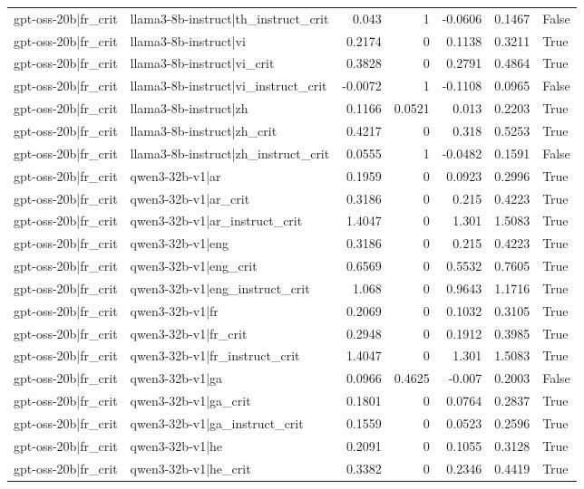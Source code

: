 \begin{table}
\begin{tabular}{l l r r r r l}
gpt-oss-20b|fr_crit & llama3-8b-instruct|th_instruct_crit & 0.043 & 1 & -0.0606 & 0.1467 & False \\
gpt-oss-20b|fr_crit & llama3-8b-instruct|vi & 0.2174 & 0 & 0.1138 & 0.3211 & True \\
gpt-oss-20b|fr_crit & llama3-8b-instruct|vi_crit & 0.3828 & 0 & 0.2791 & 0.4864 & True \\
gpt-oss-20b|fr_crit & llama3-8b-instruct|vi_instruct_crit & -0.0072 & 1 & -0.1108 & 0.0965 & False \\
gpt-oss-20b|fr_crit & llama3-8b-instruct|zh & 0.1166 & 0.0521 & 0.013 & 0.2203 & True \\
gpt-oss-20b|fr_crit & llama3-8b-instruct|zh_crit & 0.4217 & 0 & 0.318 & 0.5253 & True \\
gpt-oss-20b|fr_crit & llama3-8b-instruct|zh_instruct_crit & 0.0555 & 1 & -0.0482 & 0.1591 & False \\
gpt-oss-20b|fr_crit & qwen3-32b-v1|ar & 0.1959 & 0 & 0.0923 & 0.2996 & True \\
gpt-oss-20b|fr_crit & qwen3-32b-v1|ar_crit & 0.3186 & 0 & 0.215 & 0.4223 & True \\
gpt-oss-20b|fr_crit & qwen3-32b-v1|ar_instruct_crit & 1.4047 & 0 & 1.301 & 1.5083 & True \\
gpt-oss-20b|fr_crit & qwen3-32b-v1|eng & 0.3186 & 0 & 0.215 & 0.4223 & True \\
gpt-oss-20b|fr_crit & qwen3-32b-v1|eng_crit & 0.6569 & 0 & 0.5532 & 0.7605 & True \\
gpt-oss-20b|fr_crit & qwen3-32b-v1|eng_instruct_crit & 1.068 & 0 & 0.9643 & 1.1716 & True \\
gpt-oss-20b|fr_crit & qwen3-32b-v1|fr & 0.2069 & 0 & 0.1032 & 0.3105 & True \\
gpt-oss-20b|fr_crit & qwen3-32b-v1|fr_crit & 0.2948 & 0 & 0.1912 & 0.3985 & True \\
gpt-oss-20b|fr_crit & qwen3-32b-v1|fr_instruct_crit & 1.4047 & 0 & 1.301 & 1.5083 & True \\
gpt-oss-20b|fr_crit & qwen3-32b-v1|ga & 0.0966 & 0.4625 & -0.007 & 0.2003 & False \\
gpt-oss-20b|fr_crit & qwen3-32b-v1|ga_crit & 0.1801 & 0 & 0.0764 & 0.2837 & True \\
gpt-oss-20b|fr_crit & qwen3-32b-v1|ga_instruct_crit & 0.1559 & 0 & 0.0523 & 0.2596 & True \\
gpt-oss-20b|fr_crit & qwen3-32b-v1|he & 0.2091 & 0 & 0.1055 & 0.3128 & True \\
gpt-oss-20b|fr_crit & qwen3-32b-v1|he_crit & 0.3382 & 0 & 0.2346 & 0.4419 & True \\

\end{tabular}
\end{table}
